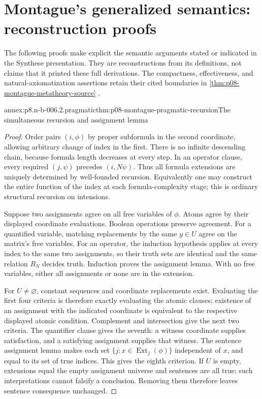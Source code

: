 \section{Montague's generalized semantics: reconstruction proofs}
\label{sec:annex-p08-n-b-006-02}

The following proofs make explicit the semantic arguments stated or
indicated in the Synthese presentation. They are reconstructions from
its definitions, not claims that it printed these full derivations.
The compactness, effectiveness, and natural-axiomatization assertions
retain their cited boundaries in
\cref{thm:p08-montague-metatheory-source}
\cite{Montague1970Pragmatics}.

\begin{annexitem}{annex:p8.n-b-006.2.pragmatic}{thm:p08-montague-pragmatic-recursion}{The simultaneous recursion and assignment lemma}
\begin{proof}
Order pairs \((i,\phi)\) by proper subformula in the second coordinate,
allowing arbitrary change of index in the first. There is no infinite
descending chain, because formula length decreases at every step. In an
operator clause, every required \((j,\psi)\) precedes \((i,N\psi)\).
Thus all formula extensions are uniquely determined by well-founded
recursion. Equivalently one may construct the entire function of the
index at each formula-complexity stage; this is ordinary structural
recursion on intensions.

Suppose two assignments agree on all free variables of \(\phi\).
Atoms agree by their displayed coordinate evaluations. Boolean
operations preserve agreement. For a quantified variable, matching
replacements by the same \(y\in U\) agree on the matrix's free
variables. For an operator, the induction hypothesis applies at every
index to the same two assignments, so their truth sets are identical
and the same relation \(R_N\) decides truth. Induction proves the
assignment lemma. With no free variables, either all assignments or
none are in the extension.

For \(U\ne\varnothing\), constant sequences and coordinate replacements
exist. Evaluating the first four criteria is therefore exactly evaluating
the atomic clauses; existence of an assignment with the indicated
coordinate is equivalent to the respective displayed atomic condition.
Complement and intersection give the next two criteria. The quantifier
clause gives the seventh: a witness coordinate supplies satisfaction,
and a satisfying assignment supplies that witness. The sentence
assignment lemma makes each set
\(\{j:x\in\operatorname{Ext}_j(\phi)\}\) independent of \(x\),
and equal to its set of true indices. This gives the eighth criterion.
If \(U\) is empty, extensions equal the empty assignment universe and
sentences are all true; such interpretations cannot falsify a conclusion.
Removing them therefore leaves sentence consequence unchanged.
\end{proof}
\end{annexitem}

